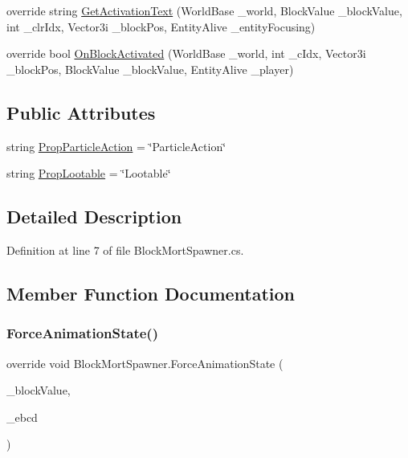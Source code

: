\begin{DoxyCompactItemize}
\item 
override string \mbox{\hyperlink{class_block_mort_spawner_ad8831c79edb44b20149bf69b2b593fab}{Get\+Activation\+Text}} (World\+Base \+\_\+world, Block\+Value \+\_\+block\+Value, int \+\_\+clr\+Idx, Vector3i \+\_\+block\+Pos, Entity\+Alive \+\_\+entity\+Focusing)
\item 
override bool \mbox{\hyperlink{class_block_mort_spawner_aaa414a7485ae53fbfd501689d41f661d}{On\+Block\+Activated}} (World\+Base \+\_\+world, int \+\_\+c\+Idx, Vector3i \+\_\+block\+Pos, Block\+Value \+\_\+block\+Value, Entity\+Alive \+\_\+player)
\end{DoxyCompactItemize}
\subsection*{Public Attributes}
\begin{DoxyCompactItemize}
\item 
string \mbox{\hyperlink{class_block_mort_spawner_afe9da3fe4eb77b95f88943323d8eb08e}{Prop\+Particle\+Action}} = \char`\"{}Particle\+Action\char`\"{}
\item 
string \mbox{\hyperlink{class_block_mort_spawner_adba21057d41a5dac48c6872392ab49fa}{Prop\+Lootable}} = \char`\"{}Lootable\char`\"{}
\end{DoxyCompactItemize}


\subsection{Detailed Description}


Definition at line 7 of file Block\+Mort\+Spawner.\+cs.



\subsection{Member Function Documentation}
\mbox{\label{class_block_mort_spawner_aff9e04e3ad7a4df9101642991c4ee9f1}} 
\subsubsection{\texorpdfstring{ForceAnimationState()}{ForceAnimationState()}}
{\footnotesize\ttfamily override void Block\+Mort\+Spawner.\+Force\+Animation\+State (\begin{DoxyParamCaption}\item[{Block\+Value}]{\+\_\+block\+Value,  }\item[{Block\+Entity\+Data}]{\+\_\+ebcd }\end{DoxyParamCaption})}



